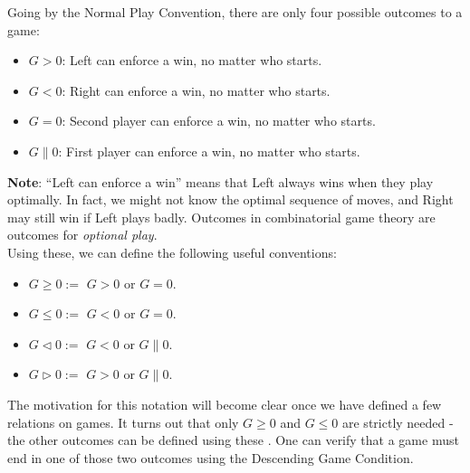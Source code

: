 \documentclass[../math194_paper.tex]{subfiles}
\begin{document}
Going by the Normal Play Convention, there are only four possible outcomes to a game:
\begin{itemize}
    \item $G > 0$: Left can enforce a win, no matter who starts.
    \item $G < 0$: Right can enforce a win, no matter who starts.
    \item $G = 0$: Second player can enforce a win, no matter who starts.
    \item $G \parallel 0$: First player can enforce a win, no matter who starts.
\end{itemize}
\textbf{Note}:  ``Left can enforce a win'' means that Left always wins when they play optimally.
In fact, we might not know the optimal sequence of moves, and Right may still win if Left plays badly.
Outcomes in combinatorial game theory are outcomes for \textit{optional play}.\\

Using these, we can define the following useful conventions:
\begin{itemize}
    \item $G \geq 0 :=$ $G > 0$ or $G = 0$.
    \item $G \leq 0 :=$ $G < 0$ or $G = 0$.
    \item $G \triangleleft 0 :=$ $G < 0$ or $G \parallel 0$.
    \item $G \triangleright 0 :=$  $G > 0$ or $G \parallel 0$.
\end{itemize}

The motivation for this notation will become clear once we have defined a few relations on games.
It turns out that only $G \geq 0$ and $G \leq 0$ are strictly needed - the other outcomes can be defined 
using these \cite[\S 2.2]{schleicher2006introduction}. One can verify that a game must end in one of those 
two outcomes using the Descending Game Condition.
\end{document}
